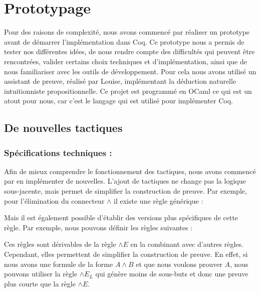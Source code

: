 \documentclass[titlepage,draft]{article}
\begin{document}
\section{Prototypage} \label{Prototypage}
Pour des raisons de complexité, nous avons commencé par réaliser un prototype avant de démarrer l'implémentation dans Coq. Ce prototype nous a permis de tester nos différentes idées, de nous rendre compte des difficultés qui peuvent être rencontrées, valider certains choix techniques et d'implémentation, ainsi que de nous familiariser avec les outils de développement. Pour cela nous avons utilisé un assistant de preuve, réalisé par Louise, implémentant la déduction naturelle intuitionniste propositionnelle. Ce projet est programmé en OCaml ce qui est un atout pour nous, car c'est le langage qui est utilisé pour implémenter Coq.

\subsection{De nouvelles tactiques}
\subsubsection{Spécifications techniques :} \label{SpecsTactiques}
Afin de mieux comprendre le fonctionnement des tactiques, nous avons commencé par en implémenter de nouvelles. L'ajout de tactiques ne change pas la logique sous-jacente, mais permet de simplifier la construction de preuve. Par exemple, pour l'élimination du connecteur $\land$ il existe une règle générique :
\begin{mathpar}
\end{mathpar}
Mais il est également possible d'établir des versions plus spécifiques de cette règle. Par exemple, nous pouvons définir les règles suivantes :
Ces règles sont dérivables de la règle $\land E$ en la combinant avec d'autres règles. Cependant, elles permettent de simplifier la construction de preuve. En effet, si nous avons une formule de la forme $A \land B$ et que nous voulons prouver $A$, nous pouvons utiliser la règle $\land E_L$ qui génère moins de sous-buts et donc une preuve plus courte que la règle $\land E$.
\end{document}
